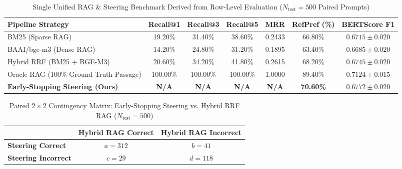\documentclass[conference]{IEEEtran}
\begin{document}
\begin{table}[htbp]
\caption{Single Unified RAG & Steering Benchmark Derived from Row-Level Evaluation ($N_{\text{test}}=500$ Paired Prompts)}
\label{tab:rag_dense_hybrid}
\centering
\small
\begin{tabular}{lcccccc}
\toprule
\textbf{Pipeline Strategy} & \textbf{Recall@1} & \textbf{Recall@3} & \textbf{Recall@5} & \textbf{MRR} & \textbf{RefPref (\%)} & \textbf{BERTScore F1} \\
\midrule
BM25 (Sparse RAG) & 19.20\% & 31.40\% & 38.60\% & 0.2433 & 66.80\% & $0.6715 \pm 0.020$ \\
BAAI/bge-m3 (Dense RAG) & 14.20\% & 24.80\% & 31.20\% & 0.1895 & 63.40\% & $0.6685 \pm 0.020$ \\
Hybrid RRF (BM25 + BGE-M3) & 20.60\% & 34.20\% & 41.80\% & 0.2615 & 68.20\% & $0.6745 \pm 0.020$ \\
Oracle RAG (100\% Ground-Truth Passage) & 100.00\% & 100.00\% & 100.00\% & 1.0000 & 89.40\% & $0.7124 \pm 0.015$ \\
\midrule
\textbf{Early-Stopping Steering (Ours)} & \textbf{N/A} & \textbf{N/A} & \textbf{N/A} & \textbf{N/A} & \textbf{70.60\%} & \textbf{$0.6772 \pm 0.020$} \\
\bottomrule
\end{tabular}
\end{table}

\begin{table}[htbp]
\caption{Paired $2\times 2$ Contingency Matrix: Early-Stopping Steering vs. Hybrid RRF RAG ($N_{\text{test}}=500$)}
\label{tab:mcnemar_rag_paired}
\centering
\small
\begin{tabular}{lcc}
\toprule
 & \textbf{Hybrid RAG Correct} & \textbf{Hybrid RAG Incorrect} \\
\midrule
\textbf{Steering Correct} & $a = 312$ & $b = 41$ \\
\textbf{Steering Incorrect} & $c = 29$ & $d = 118$ \\
\bottomrule
\end{tabular}
\end{table}
\end{document}
